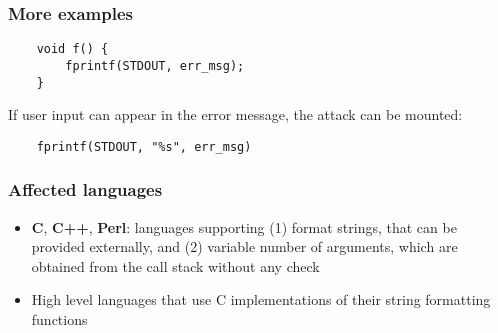 \documentclass[a4paper, 10pt, titlepage]{article}
\begin{document}
\subsubsection*{More examples}
\begin{lstlisting}
	void f() {
		fprintf(STDOUT, err_msg);
	}
\end{lstlisting}
If user input can appear in the error message, the attack can be
mounted:
\begin{lstlisting}
	fprintf(STDOUT, "%s", err_msg)
\end{lstlisting}

\subsubsection*{Affected languages}
\begin{itemize}
\item \textbf{C}, \textbf{C++}, \textbf{Perl}: languages supporting (1) format strings, that can be provided externally, and (2) variable number of arguments, which
are obtained from the call stack without any check
\item High level languages that use C implementations of their string
formatting functions
\end{itemize}
\newpage
\end{document}
